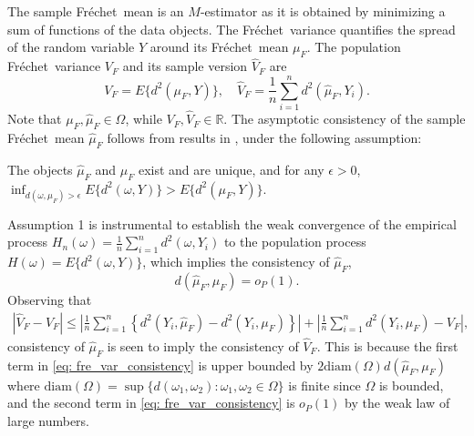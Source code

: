 \documentclass[lineno]{biometrika}
\def\cp{\citep}
\def\cp{\citep}
\def\o{\omega}
\def\O{\Omega}
\def\F{Fr\'{e}chet}
\def\V{V_F}
\def\hV{\hat{V}_F}
\def\hmu{\hat{\mu}_F}
\def\muF{\mu_F}
\def\VF{\hat{V}_F}
\def\s1n{\sum_{i=1}^n}
\def\1d{{T_\delta}}
\def\1d{{1_\delta}}
\def\1/n{\frac{1}{n}}
\begin{document}
The sample \F \ mean is an $M$-estimator as it is obtained by minimizing a sum of functions of the data objects. The \F \ variance quantifies the spread of the random variable $Y$ around its \F \ mean $\mu_F$. The population \F \ variance $\V$ and its sample version $\VF$ are 
\begin{equation*}
\label{eq: fre_var_pop}
V_F= E\{d^2(\muF,Y)\}, \quad \hV=\frac{1}{n}\sum_{i=1}^{n}d^2(\hmu,Y_i).
\end{equation*}
Note that $\mu_F, \hmu \in \O$, while $V_F, \hV \in \mathbb{R}$. The asymptotic consistency of the sample \F \ mean $\hmu$ follows from  results in \cite{mull:19:3}, under the following assumption:
\begin{assumption}
	The objects $\hat{\mu}_F$ and $\mu_F$ exist and are unique, and  for any $\epsilon > 0$, \ $\inf_{d(\omega,\mu_F)>\epsilon} E\{d^2(\omega,Y)\}> E\{d^2(\mu_F,Y)\}$.
\end{assumption}
Assumption 1 is instrumental to %
establish the weak convergence of the empirical process $H_n(\o)=\1/n \s1n d^2(\o,Y_i)$ to the population process $H(\o)= E \{d^2(\o,Y)\}$, which implies the consistency of $\hat{\mu}_F$, %
\begin{equation}
\label{eq: fre_mean_consistency}
d(\hat{\mu}_F,\mu_F) = o_P(1).
\end{equation}
Observing that 
\begin{align}
\label{eq: fre_var_consistency}
|\VF-V_F| \leq \left| \frac{1}{n} \sum_{i=1}^n \left \lbrace d^2(Y_i,\hat{\mu}_F)-d^2(Y_i,\mu_F) \right \rbrace \right| +  \left| \frac{1}{n} \sum_{i=1}^n d^2(Y_i,{\mu}_F)-V_F \right|,
\end{align}
consistency of $\hmu$ is  seen to imply the consistency of $\VF$. This is because the first term in \eqref{eq: fre_var_consistency} is upper bounded by $2 \text{diam}(\O) d(\hat{\mu}_F,\mu_F) $ where $\text{diam}(\Omega)=\sup \{d(\omega_1,\o_2): \o_1, \o_2 \in \O\}$ is finite since $\O$ is bounded, and the second term in \eqref{eq: fre_var_consistency} is $o_P(1)$ by the weak law of large numbers.
\end{document}

